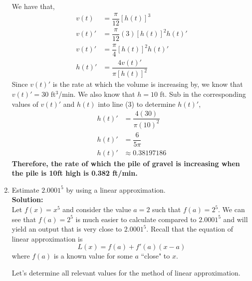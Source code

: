 \documentclass[12pt]{book}
\begin{document}
\begin{enumerate}
We have that,
\setcounter{equation}{0}
\begingroup
\addtolength{\jot}{0.5em}
\begin{align}
    v(t) &=  \dfrac{\pi}{12}[h(t)]^3 \\
    v(t)' &= \dfrac{\pi}{12} (3) [h(t)]^2 h(t)' \\
    v(t)' &= \dfrac{\pi}{4} [h(t)]^2 h(t)' \\
    h(t)' &= \dfrac{4v(t)'}{\pi [h(t)]^2}
\end{align}
\endgroup
Since $v(t)'$ is the rate at which the volume is increasing by, we know that $v(t)' = 30$ ft$^3$/min. We also know that $h=10$ ft. Sub in the corresponding values of $v(t)'$ and $h(t)$ into line (3) to determine $h(t)'$,
\begin{align}
    h(t)' &= \dfrac{4(30)}{\pi (10)^2} \\
    h(t)' &= \dfrac{6}{5\pi} \\
    h(t)' &\approx 0.38197186
\end{align}
\textbf{Therefore, the rate of which the pile of gravel is increasing when the pile is 10ft high is 0.382 ft/min.}



\newpage

\item Estimate $2.0001^5$ by using a linear approximation.\\

\textbf{Solution:}\\
Let $f(x)=x^5$ and consider the value $a = 2$ such that $f(a) = 2^5$. We can see that $f(a) = 2^5$ is much easier to calculate compared to $2.0001^5$ and will yield an output that is very close to $2.0001^5$. Recall that the equation of linear approximation is
$$L(x) = f(a) + f'(a)(x-a)$$
where $f(a)$ is a known value for some $a$ ``close" to $x$.

Let's determine all relevant values for the method of linear approximation.\\


\end{enumerate}
\end{document}
